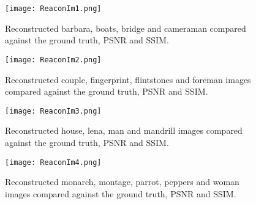 \begin{figure}[!htb]
\vspace{1cm}
\centering 
\texttt{[image: ReaconIm1.png]} 
\caption[Reconstructed testing images subset 1]{Reconstructed barbara, boats, bridge and cameraman compared against the ground truth, PSNR and SSIM.}
\label{fig:Recon1} 
\end{figure} 



\begin{figure}[!hb] 
\vspace{4.5cm}
\centering
\texttt{[image: ReaconIm2.png]} 
\caption[Reconstructed testing images subset 2]{Reconstructed couple, fingerprint, flintstones and foreman images compared against the ground truth, PSNR and SSIM.}
\label{fig:Recon2} 
\end{figure}  



\begin{figure}[!htb]
\vspace{4.5cm}
\centering 
\texttt{[image: ReaconIm3.png]} 
\caption[Reconstructed testing images subset 3]{Reconstructed house, lena, man and mandrill images compared against the ground truth, PSNR and SSIM.}
\label{fig:Recon3} 
\end{figure} 

\begin{figure}[!htb] 
\vspace{3.5cm}
\centering 
\texttt{[image: ReaconIm4.png]}
\caption[Reconstructed testing images subset 4]{Reconstructed monarch, montage, parrot, peppers and woman images compared against the ground truth, PSNR and SSIM.}
\label{fig:Recon4} 
\end{figure} 


\FloatBarrier
